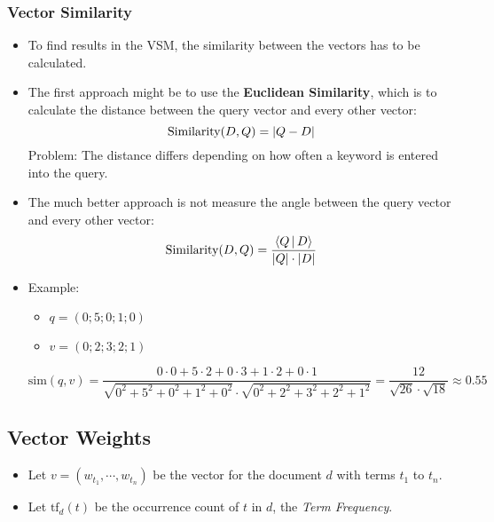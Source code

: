        		\subsubsection{Vector Similarity} %
       			\begin{itemize}
       				\item To find results in the VSM, the similarity between the vectors has to be calculated.
       				\item The first approach might be to use the \textbf{Euclidean Similarity}, which is to calculate the distance between the query vector and every other vector:
       					\begin{equation*}
           					\text{Similarity}(D, Q) = \abs{Q - D}
       					\end{equation*}
       					Problem: The distance differs depending on how often a keyword is entered into the query.
       				\item The much better approach is not measure the angle between the query vector and every other vector:
       					\begin{equation*}
           					\text{Similarity}(D, Q) = \frac{\langle Q \,\vert\, D \rangle}{\abs{Q} \cdot \abs{D}}
       					\end{equation*}
					\item Example:
						\begin{itemize}
							\item \(q = (0;5;0;1;0)\)
							\item \(v = (0;2;3;2;1)\)
						\end{itemize}
						\begin{equation*}
							\text{sim}(q,v) = \frac{0 \cdot 0 + 5 \cdot 2 + 0 \cdot 3 + 1 \cdot 2 + 0 \cdot 1}{\sqrt{0^2 + 5^2 + 0^2 + 1^2 + 0^2} \cdot \sqrt{0^2 + 2^2 + 3^2 +2^2 + 1^2}}
							= \frac{12}{\sqrt{26} \cdot \sqrt{18}} \approx 0.55
						\end{equation*}

       			\end{itemize}

        \subsection{Vector Weights} %
        	\begin{itemize}
        		\item Let \( v = (w_{t_1}, \cdots, w_{t_n}) \) be the vector for the document \( d \) with terms \( t_1 \) to \( t_n \).
        		\item Let \( \text{tf}_d(t) \) be the occurrence count of \(t\) in \(d\), the \textit{Term Frequency}.
        	\end{itemize}

